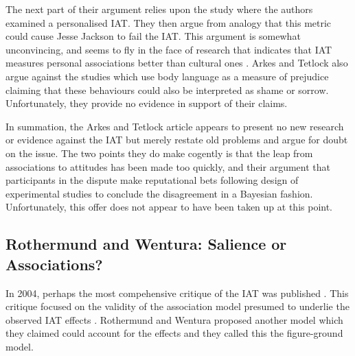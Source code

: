 The next part of their argument relies upon the \cite{Olson2004} study where the authors examined a  personalised  IAT. They then argue from analogy that this metric could cause Jesse Jackson to fail the IAT. This argument is somewhat unconvincing, and seems to fly in the face of research that indicates that IAT measures personal associations better than cultural ones \cite{Nosek2008a}. Arkes and Tetlock also argue against the studies which use body language as a measure of prejudice  claiming that these behaviours could also be interpreted as shame or sorrow. Unfortunately, they provide no evidence in support of their claims. 


In summation, the Arkes and Tetlock article appears to present no new research or evidence against the IAT but merely restate old problems and argue for doubt on the issue. The two points they do make cogently is that the leap from associations to attitudes has been made too quickly, and their argument that participants in the dispute make reputational bets following design of experimental studies to conclude the disagreement in a Bayesian fashion. Unfortunately, this offer does not appear to have been taken up at this point. 

\subsection{Rothermund and Wentura: Salience or Associations?}
\label{sec:roth-went-sali}
In 2004, perhaps the most compehensive critique of the IAT was published \cite{Rothermund2004}. This critique focused on the validity of the association model presumed to underlie the observed IAT effects \cite{Greenwald1998}. Rothermund and Wentura proposed another model which they claimed could account for the effects and they called this the figure-ground model. 

